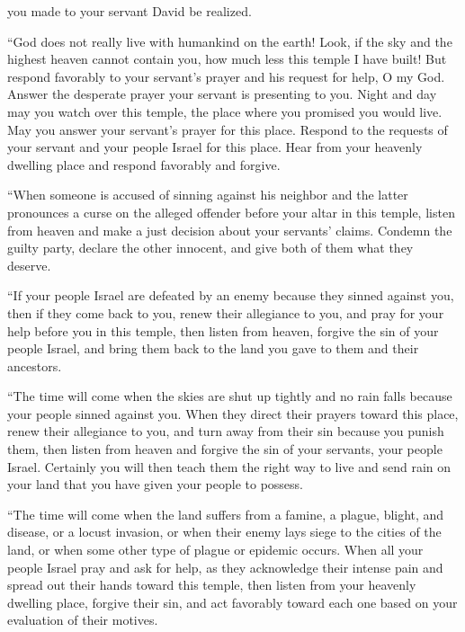 {you made to your servant
David
be realized.
\par }{\PP {}“God
does not really
live
with
humankind
on
the earth! Look,
if the sky
and the highest
heaven
cannot
contain
you, how much
less
this
temple
I have
built!
But
respond favorably
to your servant’s
prayer
and his request for help,
O
{}
my God.
Answer the desperate
prayer
your servant
is presenting to you.
Night
and day
may
you watch
over
this
temple,
the place
where
you promised
you would live.
May you answer
your servant’s
prayer
for
this
place.
Respond
to
the requests
of your servant
and your people
Israel
for this
place.
Hear
from
your heavenly
dwelling
place
and respond
favorably
and forgive.
\par }{\PP {}“When
someone
is accused of sinning
against his neighbor
and the latter pronounces
a curse
on the alleged offender
before
your altar
in this
temple,
listen
from
heaven
and make
a just decision
about your servants’
claims.
Condemn the guilty
party,
declare
the other innocent,
and give
both
of them what they deserve.
\par }{\PP {}“If
your people
Israel
are defeated
by an enemy
because
they sinned
against you, then if they come back
to you, renew
their allegiance
to you, and pray
for your help
before
you in this
temple,
then
listen
from
heaven,
forgive
the sin
of your people
Israel,
and bring them back
to
the land
you gave
to them
and their ancestors.
\par }{\PP {}“The time will come when the skies
are shut up
tightly and no
rain
falls because
your people sinned against
you. When they direct their prayers
toward
this
place,
renew
their allegiance
to you, and turn
away from their sin
because
you punish them,
then
listen
from heaven
and forgive
the sin
of your servants,
your people
Israel.
Certainly
you will then teach
them
the right
way
to
live and send
rain
on
your land
that
you have given
your people
to possess.
\par }{\PP {}“The time will come
when
the land
suffers from a famine,
a plague,
blight,
and disease,
or a locust
invasion,
or when
their enemy
lays siege
to the cities
of the land,
or when some other type of plague
or epidemic occurs.
When
all
your people
Israel
pray
and ask for help,
as
they acknowledge
their intense pain
and spread out
their hands
toward
this
temple,
then listen
from
your heavenly
dwelling
place,
forgive
their sin, and act
favorably toward each
one based on
your evaluation
of their motives.
}
